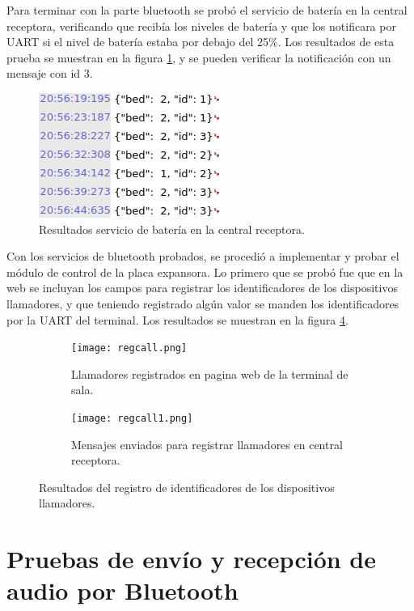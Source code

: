 Para terminar con la parte bluetooth se probó el servicio de batería en la central receptora, verificando que recibía los niveles de batería y que los notificara por UART si el nivel de batería estaba por debajo del 25\%. Los resultados de esta prueba se muestran en la figura \ref{fig:Pbas2}, y se pueden verificar la notificación con un mensaje con id 3.

\begin{figure}[htpb]
	\centering
	\includegraphics[scale=0.7]{./Figures/Pbas2.png}	
	\caption{Resultados servicio de batería en la central receptora.}
	\label{fig:Pbas2}
\end{figure}

Con los servicios de bluetooth probados, se procedió a implementar y probar el módulo de control de la placa expansora. Lo primero que se probó fue que en la web se incluyan los campos para registrar los identificadores de los dispositivos llamadores, y que teniendo registrado algún valor se manden los identificadores por la UART del terminal. Los resultados se muestran en la figura \ref{fig:Pllam}.

\begin{figure}[htpb]
	\centering
   	\begin{subfigure}[b]{1\textwidth}
   		\centering
      	\texttt{[image: regcall.png]}
      	\caption{Llamadores registrados en pagina web de la terminal de sala.}
      	\label{fig:PllamA}
   	\end{subfigure}%
   	\newline
   	\newline
   	\begin{subfigure}[b]{1\textwidth}
   		\centering
      	\texttt{[image: regcall1.png]}
      	\caption{Mensajes enviados para registrar llamadores en central receptora.}
      	\label{fig:PllamB}
   	\end{subfigure}%
	\caption{Resultados del registro de identificadores de los dispositivos llamadores.}
	\label{fig:Pllam}
\end{figure}

\section{Pruebas de envío y recepción de audio por Bluetooth}
\label{sec:pruebasACS}

